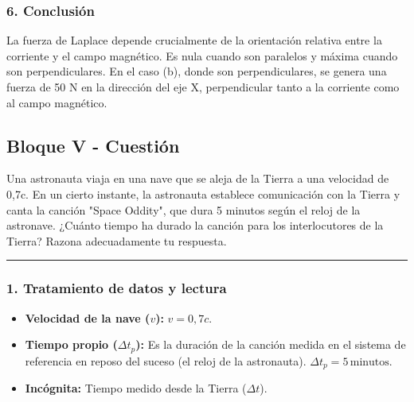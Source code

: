 \subsubsection*{6. Conclusión}
\begin{cajaconclusion}
La fuerza de Laplace depende crucialmente de la orientación relativa entre la corriente y el campo magnético. Es nula cuando son paralelos y máxima cuando son perpendiculares. En el caso (b), donde son perpendiculares, se genera una fuerza de 50 N en la dirección del eje X, perpendicular tanto a la corriente como al campo magnético.
\end{cajaconclusion}

\newpage

\subsection{Bloque V - Cuestión}
\label{subsec:B5_2014_jul_ext}

\begin{cajaenunciado}
Una astronauta viaja en una nave que se aleja de la Tierra a una velocidad de 0,7c. En un cierto instante, la astronauta establece comunicación con la Tierra y canta la canción "Space Oddity", que dura 5 minutos según el reloj de la astronave. ¿Cuánto tiempo ha durado la canción para los interlocutores de la Tierra? Razona adecuadamente tu respuesta. 
\end{cajaenunciado}
\hrule

\subsubsection*{1. Tratamiento de datos y lectura}
\begin{itemize}
    \item \textbf{Velocidad de la nave ($v$):} $v = 0,7c$.
    \item \textbf{Tiempo propio ($\Delta t_p$):} Es la duración de la canción medida en el sistema de referencia en reposo del suceso (el reloj de la astronauta). $\Delta t_p = 5\,\text{minutos}$.
    \item \textbf{Incógnita:} Tiempo medido desde la Tierra ($\Delta t$).
\end{itemize}

